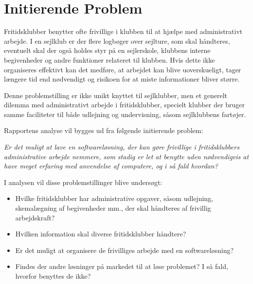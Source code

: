 \section{Initierende Problem}

Fritidsklubber benytter ofte frivillige i klubben til at hjælpe med administrativt arbejde.  I en sejlklub er der flere
logbøger over sejlture, som skal håndteres, eventuelt skal der også holdes styr på en sejlerskole, klubbens interne
begivenheder og andre funktioner relateret til klubben. Hvis dette ikke organiseres effektivt kan det medføre, at
arbejdet kan blive uoverskueligt, tager længere tid end nødvendigt og risikoen for at miste informationer bliver større.

Denne problemstilling er ikke unikt knyttet til sejlklubber, men et generelt dilemma med administrativt
arbejde i fritidsklubber, specielt klubber der bruger samme faciliteter til både udlejning og undervisning, såsom sejlklubbens fartøjer.

Rapportens analyse vil bygges ud fra følgende initierende problem:

\textit{Er det muligt at lave en softwareløsning, der kan gøre frivillige i fritidsklubbers administrative
arbejde nemmere, som stadig er let at benytte uden nødvendigvis at have meget erfaring med anvendelse af
computere, og i så fald hvordan?}

I analysen vil disse problemstillinger blive undersøgt:

\begin{itemize}
  \item Hvilke fritidsklubber har administrative opgaver, såsom udlejning, skemalægning af begivenheder mm., der
        skal håndteres af frivillig arbejdskraft?
  \item Hvilken information skal diverse fritidsklubber håndtere?
  \item Er det muligt at organisere de frivilliges arbejde med en softwareløsning?
  \item Findes der andre løsninger på markedet til at løse problemet? I så fald, hvorfor benyttes de ikke?
\end{itemize}